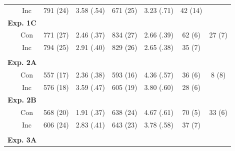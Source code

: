 \documentclass[]{DissertateCUNY}
\begin{document}
\begin{table}[htbp]
{\begin{tabular}{rrcccccc}
    & \multicolumn{1}{c}{Inc}
    & \multicolumn{1}{c}{791 (24)} 
    & \multicolumn{1}{c}{3.58 (.54)} 
    & \multicolumn{1}{c}{671 (25)}
    & \multicolumn{1}{c}{3.23 (.71)} 
    & \multicolumn{1}{c}{42 (14)} &  \\
    \multicolumn{2}{c}{\textbf{Exp. 1C}} &       &       &       &       &       &  \\
    & \multicolumn{1}{c}{Con} 
    & \multicolumn{1}{c}{771 (27)} 
    & \multicolumn{1}{c}{2.46 (.37)} 
    & \multicolumn{1}{c}{834 (27)} 
    & \multicolumn{1}{c}{2.66 (.39)} 
    & \multicolumn{1}{c}{62 (6)} 
    & \multicolumn{1}{c}{27 (7)} \\
    & \multicolumn{1}{c}{Inc} 
    & \multicolumn{1}{c}{794 (25)} 
    & \multicolumn{1}{c}{2.91 (.40)} 
    & \multicolumn{1}{c}{829 (26)} 
    & \multicolumn{1}{c}{2.65 (.38)} 
    & \multicolumn{1}{c}{35 (7)} &  \\
    &       &       &       &       &       &       &  \\
    \midrule
    \multicolumn{2}{c}{\textbf{Exp. 2A}} &       &       &       &       &       &  \\
    & \multicolumn{1}{c}{Con} 
    & \multicolumn{1}{c}{557 (17)} 
    & \multicolumn{1}{c}{2.36 (.38)} 
    & \multicolumn{1}{c}{593 (16)} 
    & \multicolumn{1}{c}{4.36 (.57)} 
    & \multicolumn{1}{c}{36 (6)} 
    & \multicolumn{1}{c}{8 (8)} \\
    & \multicolumn{1}{c}{Inc} 
    & \multicolumn{1}{c}{576 (18)} 
    & \multicolumn{1}{c}{3.59 (.47)} 
    & \multicolumn{1}{c}{605 (19)} 
    & \multicolumn{1}{c}{3.80 (.60)} 
    & \multicolumn{1}{c}{28 (6)} &  \\
    \multicolumn{2}{c}{\textbf{Exp. 2B}} &       &       &       &       &       &  \\
    & \multicolumn{1}{c}{Con} 
    & \multicolumn{1}{c}{568 (20)} 
    & \multicolumn{1}{c}{1.91 (.37)} 
    & \multicolumn{1}{c}{638 (24)} 
    & \multicolumn{1}{c}{4.67 (.61)} 
    & \multicolumn{1}{c}{70 (5)} 
    & \multicolumn{1}{c}{33 (6)} \\
    & \multicolumn{1}{c}{Inc} 
    & \multicolumn{1}{c}{606 (24)} 
    & \multicolumn{1}{c}{2.83 (.41)} 
    & \multicolumn{1}{c}{643 (23)} 
    & \multicolumn{1}{c}{3.78 (.58)} 
    & \multicolumn{1}{c}{37 (7)} &  \\
    &       &       &       &       &       &       &  \\
    \midrule
    \multicolumn{2}{c}{\textbf{Exp. 3A}} &       &       &       &       &       &  \\

\end{tabular}}
\end{table}
\end{document}
